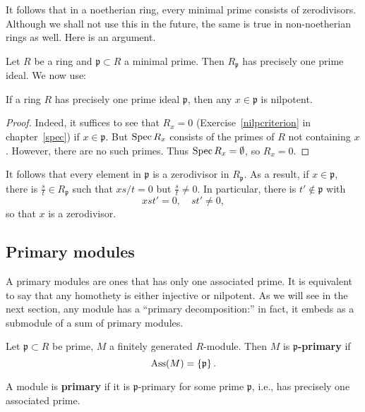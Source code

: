 \begin{remark} 
It follows that in a noetherian ring, every minimal prime consists of
zerodivisors. Although we shall not use this in the future, the same is true
in non-noetherian rings as well.  Here is an argument.

Let $R$ be a ring and $\mathfrak{p} \subset R$ a minimal prime. Then
$R_{\mathfrak{p}}$ has precisely one prime ideal.
We now use:

\begin{lemma} 
If a ring $R$ has precisely one prime ideal $\mathfrak{p}$, then any $x \in
\mathfrak{p}$ is nilpotent.
\end{lemma} 
\begin{proof} 
Indeed, it suffices to see that $R_x = 0$ (Exercise~\ref{nilpcriterion} in
chapter~\ref{spec}) if $x \in
\mathfrak{p}$. But $\operatorname{Spec} R_x$
consists of the primes of $R$ not containing $x$. However, there are no such
primes. Thus $\operatorname{Spec} R_x = \emptyset$, so $R_x = 0$.
\end{proof} 

It follows that every element in $\mathfrak{p}$ is a zerodivisor in
$R_{\mathfrak{p}}$.
As a result, if $x \in \mathfrak{p}$, there is $\frac{s}{t} \in
R_{\mathfrak{p}}$ such that $xs/t = 0$ but $\frac{s}{t} \neq 0$.
In particular, there is $t' \notin \mathfrak{p}$ with 
\[ xst' = 0, \quad st' \neq 0,  \]
so that $x$ is a zerodivisor. 
\end{remark}



\subsection{Primary modules}

A primary modules are ones that has only one associated prime. It is equivalent
to say that any homothety is either injective or nilpotent. 
As we will see in the next section, any module has a ``primary
decomposition:'' in fact, it embeds as a submodule of a sum of primary
modules.

\begin{definition} 
Let $\mathfrak{p} \subset R$ be prime, $M$ a finitely generated  $R$-module. Then $M$ is
\textbf{$\mathfrak{p}$-primary} if 
\[ \operatorname{Ass}(M) = \left\{\mathfrak{p}\right\}.  \]

A module is \textbf{primary} if it is $\mathfrak{p}$-primary for some
prime $\mathfrak{p}$, i.e., has precisely one associated prime. 
\end{definition} 

